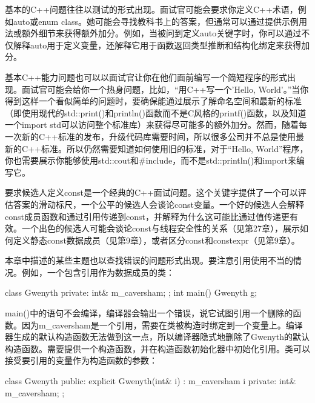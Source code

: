 
基本的C++问题往往以测试的形式出现。面试官可能会要求你定义C++术语，例如auto或enum class。她可能会寻找教科书上的答案，但通常可以通过提供示例用法或额外细节来获得额外加分。例如，当被问到定义auto关键字时，你可以通过不仅解释auto用于定义变量，还解释它用于函数返回类型推断和结构化绑定来获得加分。

基本C++能力问题也可以以面试官让你在他们面前编写一个简短程序的形式出现。面试官可能会给你一个热身问题，比如，“用C++写一个'Hello, World'。”当你得到这样一个看似简单的问题时，要确保能通过展示了解命名空间和最新的标准（即使用现代的std::print()和println()函数而不是C风格的printf()函数，以及知道一个import std可以访问整个标准库）来获得尽可能多的额外加分。然而，随着每一次新的C++标准的发布，升级代码库需要时间，所以很多公司并不总是使用最新的C++标准。所以仍然需要知道如何使用旧的标准，对于“Hello, World”程序，你也需要展示你能够使用std::cout和\#include，而不是std::println()和import来编写它。

要求候选人定义const是一个经典的C++面试问题。这个关键字提供了一个可以评估答案的滑动标尺，一个公平的候选人会谈论const变量。一个好的候选人会解释const成员函数和通过引用传递到const，并解释为什么这可能比通过值传递更有效。一个出色的候选人可能会谈论const与线程安全性的关系（见第27章），展示如何定义静态const数据成员（见第9章），或者区分const和constexpr（见第9章）。

本章中描述的某些主题也以查找错误的问题形式出现。要注意引用使用不当的情况。例如，一个包含引用作为数据成员的类：

\begin{cpp}
class Gwenyth
{
    private:
        int& m_caversham;
};
int main()
{
    Gwenyth g;
}
\end{cpp}

main()中的语句不会编译，编译器会输出一个错误，说它试图引用一个删除的函数。因为m\_caversham是一个引用，需要在类被构造时绑定到一个变量上。编译器生成的默认构造函数无法做到这一点，所以编译器隐式地删除了Gwenyth的默认构造函数。需要提供一个构造函数，并在构造函数初始化器中初始化引用。类可以接受要引用的变量作为构造函数的参数：

\begin{cpp}
class Gwenyth
{
    public:
        explicit Gwenyth(int& i) : m_caversham { i } { }
    private:
        int& m_caversham;
};
\end{cpp}
